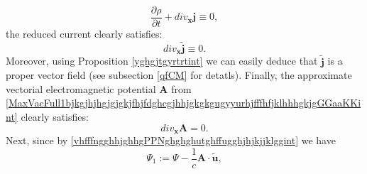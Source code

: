 \documentclass{article}
\theoremstyle{definition}
\theoremstyle{remark}
\renewcommand{\vec}[1]{\mathbf{#1}}
\newcommand{\er}{\eqref}
\newcommand{\er}{\eqref}
\begin{document}
\begin{equation}\label{toksohraneniezarjadaPPNaaint}
\frac{\partial\rho}{\partial t}+div_{\vec x}\vec j\equiv 0,
\end{equation}
the reduced current clearly satisfies:
\begin{equation}\label{divreducedcurrentPPNaaint}
div_{\vec x}\vec {\widetilde j}\equiv 0.
\end{equation}
Moreover,
using Proposition
\ref{yghgjtgyrtrtint}
we can easily deduce that $\vec{\widetilde j}$ is a proper vector
field (see subsection \ref{qfCM} for detatls). Finally, the
approximate vectorial electromagnetic potential $\vec A$ from
\er{MaxVacFull1bjkgjhjhgjgjgkjfhjfdghcgjhhjgkgkgugyyurhjfffhfjklhhhgkjgGGaaKKint}
clearly satisfies:
\begin{equation}\label{MaxVacFull1bjkgjhjhgjgjgkjfhjfdghcgjhhjgkgkgugyyurkkkGGGGGaaint}
div_{\vec x}\vec A=0.
\end{equation}
Next, since by \er{vhfffngghhjghhgPPNghghghutghffugghjhjkjjklggint}
we have
\begin{equation}\label{vhfffngghhjghhgPPNghghghutghffugghjhjkjjklgghkhhhint}
\Psi_1:=\Psi-\frac{1}{c}\vec A\cdot\vec {\tilde u},
\end{equation}
%
%
%
\begin{comment}
and since by
\er{MaxVacFull1bjkgjhjhgjgjgkjfhjfdghcgjhhjgkgkgugyyurkkkGGGGGaaint},
\er{apfrm6} and \er{apfrm9} we have
\begin{multline}\label{MaxVacFullPPNnnnffffffyuughjhjhjhhjjkjhkkjhhjhghGGGGaajjkkjkjljint}
div_{\vec x} \left\{\left(d_{\vec x}\vec {\tilde u}+\left\{d_{\vec
x}\vec {\tilde u}\right\}^T\right)\cdot\vec A-\left(div_{\vec x}\vec
{\tilde u}\right)\vec A\right\}-\Delta_{\vec x}\left(\vec A\cdot\vec
{\tilde u}\right)=\\div_{\vec x} \left\{\left(d_{\vec x}\vec {\tilde
u}+\left\{d_{\vec x}\vec {\tilde u}\right\}^T\right)\cdot\vec
A-\left(div_{\vec x}\vec {\tilde u}\right)\vec A-\nabla_{\vec
x}\left(\vec A\cdot\vec {\tilde u}\right)\right\}=\\ div_{\vec x}
\left\{d_{\vec x}\vec {\tilde u}\cdot\vec A-d_{\vec x}\vec
A\cdot\vec {\tilde u}+\left(div_{\vec x}\vec A\right)\vec {\tilde
u}-\left(div_{\vec x}\vec {\tilde u}\right)\vec A-\vec {\tilde
u}\times curl_{\vec x}\vec A\right\}\\= div_{\vec x}
\left\{curl_{\vec x}\left(\vec {\tilde u}\times\vec A\right)-\vec
{\tilde u}\times curl_{\vec x}\vec A\right\}= -div_{\vec x}
\left\{\vec {\tilde u}\times curl_{\vec x}\vec A\right\},
\end{multline}
\end{comment}
\end{document}
